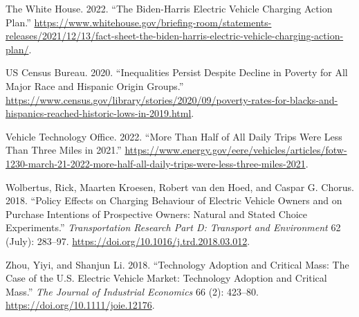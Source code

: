 \documentclass[
  letterpaper,
  DIV=11,
  numbers=noendperiod]{scrartcl}
\newlength{\cslhangindent}
\newlength{\cslentryspacingunit} %
\newenvironment{CSLReferences}[2] %
 {%
  \setlength{\parindent}{0pt}
  \ifodd #1
  \let\oldpar\par
  \def\par{\hangindent=\cslhangindent\oldpar}
  \fi
  \setlength{\parskip}{#2\cslentryspacingunit}
 }%
 {}
\begin{document}
\begin{CSLReferences}{1}{0}
\leavevmode{}%
The White House. 2022. {``The Biden-Harris Electric Vehicle Charging
Action Plan.''}
\url{https://www.whitehouse.gov/briefing-room/statements-releases/2021/12/13/fact-sheet-the-biden-harris-electric-vehicle-charging-action-plan/}.

\leavevmode{}%
US Census Bureau. 2020. {``Inequalities Persist Despite Decline in
Poverty for All Major Race and Hispanic Origin Groups.''}
\url{https://www.census.gov/library/stories/2020/09/poverty-rates-for-blacks-and-hispanics-reached-historic-lows-in-2019.html}.

\leavevmode{}%
Vehicle Technology Office. 2022. {``More Than Half of All Daily Trips
Were Less Than Three Miles in 2021.''}
\url{https://www.energy.gov/eere/vehicles/articles/fotw-1230-march-21-2022-more-half-all-daily-trips-were-less-three-miles-2021}.

\leavevmode{}%
Wolbertus, Rick, Maarten Kroesen, Robert van den Hoed, and Caspar G.
Chorus. 2018. {``Policy Effects on Charging Behaviour of Electric
Vehicle Owners and on Purchase Intentions of Prospective Owners: Natural
and Stated Choice Experiments.''} \emph{Transportation Research Part D:
Transport and Environment} 62 (July): 283--97.
\url{https://doi.org/10.1016/j.trd.2018.03.012}.

\leavevmode{}%
Zhou, Yiyi, and Shanjun Li. 2018. {``Technology Adoption and Critical
Mass: The Case of the U.S. Electric Vehicle Market: Technology Adoption
and Critical Mass.''} \emph{The Journal of Industrial Economics} 66 (2):
423--80. \url{https://doi.org/10.1111/joie.12176}.

\end{CSLReferences}
\end{document}
